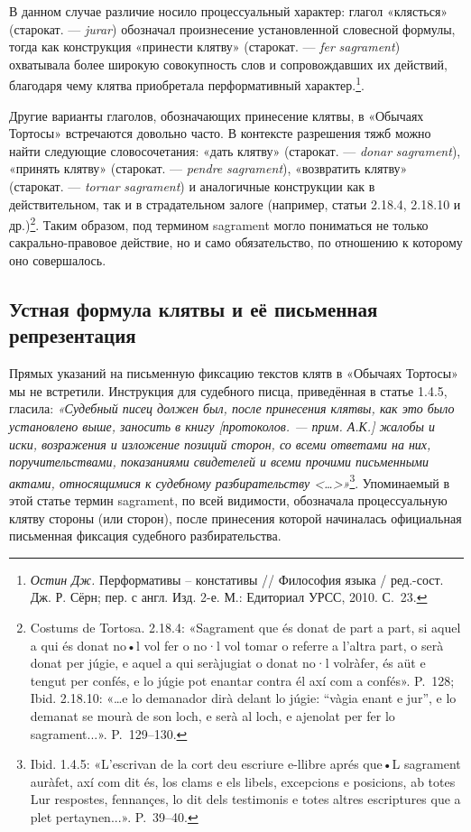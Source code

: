 В данном случае различие носило процессуальный характер: глагол «клясться» (старокат. --- \emph{jurar}) обозначал произнесение установленной словесной формулы, тогда как конструкция «принести клятву» (старокат. --- \emph{fer}\emph{ }\emph{sagrament}) охватывала более широкую совокупность слов и сопровождавших их действий, благодаря чему клятва приобретала перформативный характер.\footnote{\emph{Остин Дж.} Перформативы -- констативы // Философия языка / ред.-сост. Дж. Р. Сёрн; пер. с англ. Изд. 2-е. М.: Едиториал УРСС, 2010. С.~23.}.

Другие варианты глаголов, обозначающих принесение клятвы, в «Обычаях Тортосы» встречаются довольно часто. В контексте разрешения тяжб можно найти следующие словосочетания: «дать клятву» (старокат. --- \emph{donar}\emph{ }\emph{sagrament}), «принять клятву» (старокат. --- \emph{pendre}\emph{ }\emph{sagrament}), «возвратить клятву» (старокат. --- \emph{tornar}\emph{ }\emph{sagrament}) и аналогичные конструкции как в действительном, так и в страдательном залоге (например, статьи 2.18.4, 2.18.10 и др.)\footnote{Costums de Tortosa. 2.18.4: «Sagrament que és donat de part a part, si aquel a qui és donat no•l vol fer o no·l vol tomar o referre a l'altra part, o serà donat per júgie, e aquel a qui seràjugiat o donat no·l volràfer, és aüt e tengut per confés, e lo júgie pot enantar contra él axí com a confés». P.~128; Ibid. 2.18.10: «…e lo demanador dirà delant lo júgie: “vàgia enant e jur”, e lo demanat se mourà de son loch, e serà al loch, e ajenolat per fer lo sagrament...». P.~129--130.}. Таким образом, под термином sagrament могло пониматься не только сакрально-правовое действие, но и само обязательство, по отношению к которому оно совершалось.

\subsection{Устная формула клятвы и её письменная репрезентация}

Прямых указаний на письменную фиксацию текстов клятв в «Обычаях Тортосы» мы не встретили. Инструкция для судебного писца, приведённая в статье 1.4.5, гласила:\emph{ «Судебный писец должен был, после принесения клятвы, как это было установлено выше, заносить в книгу [протоколов. --- прим. А.К.] жалобы и иски, возражения и изложение позиций сторон, со всеми ответами на них, поручительствами, показаниями свидетелей и всеми прочими письменными актами, относящимися к судебному разбирательству <…>»}\footnote{Ibid. 1.4.5: «L'escrivan de la cort deu escriure e-llibre aprés que•L sagrament auràfet, axí com dit és, los clams e els libels, excepcions e posicions, ab totes Lur respostes, fennançes, lo dit dels testimonis e totes altres escriptures que a plet pertaynen...». P.~39--40.}. Упоминаемый в этой статье термин sagrament, по всей видимости, обозначала процессуальную клятву стороны (или сторон), после принесения которой начиналась официальная письменная фиксация судебного разбирательства.

